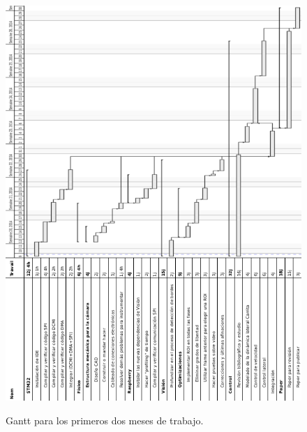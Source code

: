 \begin{figure}[ht!]
\begin{center}
\includegraphics[height=1.3\textwidth]{fig/ganttscaled}\\
\caption{Gantt para los primeros dos meses de trabajo.}
\label{fig_gannta}
\end{center}
\end{figure}
